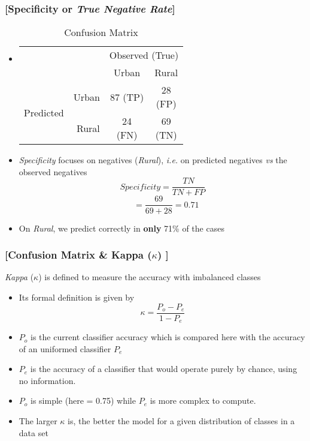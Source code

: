 \documentclass[xcolor=x11names,compress]{beamer}
\renewcommand{\(}{\begin{columns}}
\renewcommand{\)}{\end{columns}}
\newcommand{\<}[1]{\begin{column}{#1}}
\renewcommand{\>}{\end{column}}
\begin{document}
\begin{frame} %
\frametitle{\textcolor{brique}{[Specificity or \textit{True Negative Rate}]}}
\begin{itemize}[<+->]
  \item[]
    \begin{table}[]
    \begin{tabular}{l r|c|c|}

                              & & \multicolumn{2}{c|}{Observed (True)}                                                                                          \\
                              & &    Urban  &  Rural  \\  \hline
    \multirow{2}{*}{Predicted}& Urban & \shortstack[c]{$87$ \\ \tiny{(TP)}}& \shortstack[c]{28 \\ \tiny{(FP)}} \\ \cline{2-4}
                              & Rural &  \shortstack[c]{24 \\ \tiny{(FN)}}& \shortstack[c]{69 \\ \tiny{(TN)}} \\ \hline
    \end{tabular}
    \caption{Confusion Matrix}
    \end{table}
  \item \textit{Specificity} focuses on  negatives (\textit{Rural}), \textit{i.e.} on predicted negatives \textit{vs} the observed negatives
   $$ Specificity = \frac{TN}{TN + FP} $$
   $$
 \; \; \;  =  \frac{69}{69+28} = 0.71
 $$
  \item On \textit{Rural}, we predict correctly in \textbf{only} 71\% of the cases
\end{itemize}
\end{frame}

\begin{frame} %
\frametitle{\textcolor{brique}{[Confusion Matrix  \& Kappa ($\kappa$) ]}}
\emph{Kappa} ($\kappa$) is defined to measure the accuracy with imbalanced classes
\begin{itemize}[<+->]
  \item[] Its formal definition is given by
  $$ \kappa = \frac{P_o - P_e}{1 - P_e}  $$
  \item[]$P_o$ is the current classifier accuracy which is compared here with the accuracy of an uniformed classifier $P_e$
  \item[] $P_e$ is the accuracy of a classifier that would operate purely by chance, using no information.
  \item $P_o$ is simple (here = 0.75) while  $P_e$  is more complex to compute.
  \item  The larger $\kappa $ is, the better the model for a given distribution of classes in a data set
  \end{itemize}
\end{frame}
\end{document}
